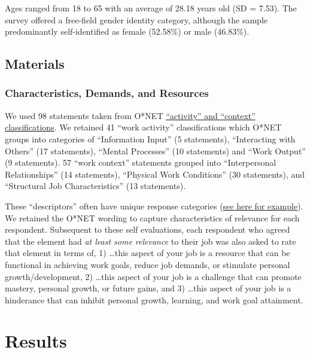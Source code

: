 \documentclass[
  english,
  man]{apa6}
\begin{document}
Ages ranged from 18 to 65 with an average of 28.18 years old (SD = 7.53). The survey offered a free-field gender identity category, although the sample predominantly self-identified as female (52.58\%) or male (46.83\%).

\hypertarget{materials}{%
\subsection{Materials}\label{materials}}

\hypertarget{characteristics-demands-and-resources}{%
\subsubsection{Characteristics, Demands, and Resources}\label{characteristics-demands-and-resources}}

We used 98 statements taken from O*NET \href{https://www.O*NETonline.org/find/descriptor/result/4.A.1.b.3}{\enquote{activity} and \enquote{context} classifications}. We retained 41 \enquote{work activity} classifications which O*NET groups into categories of \enquote{Information Input} (5 statements), \enquote{Interacting with Others} (17 statements), \enquote{Mental Processes} (10 statements) and \enquote{Work Output} (9 statements). 57 \enquote{work context} statements grouped into \enquote{Interpersonal Relationships} (14 statements), \enquote{Physical Work Conditions} (30 statements), and \enquote{Structural Job Characteristics} (13 statements).

These \enquote{descriptors} often have unique response categories (\href{https://www.O*NETonline.org/find/descriptor/result/4.C.1.c.2}{see here for example}). We retained the O*NET wording to capture characteristics of relevance for each respondent. Subsequent to these self evaluations, each respondent who agreed that the element had \emph{at least some relevance} to their job was also asked to rate that element in terms of, 1) \ldots this aspect of your job is a resource that can be functional in achieving work goals, reduce job demands, or stimulate personal growth/development, 2) \ldots this aspect of your job is a challenge that can promote mastery, personal growth, or future gains, and 3) \ldots this aspect of your job is a hinderance that can inhibit personal growth, learning, and work goal attainment.

\hypertarget{results}{%
\section{Results}\label{results}}
\end{document}
